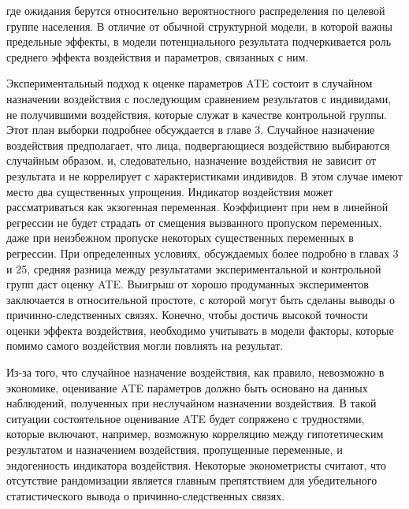 где ожидания берутся относительно вероятностного распределения по целевой группе населения. В отличие от обычной структурной модели, в которой важны  предельные эффекты, в модели потенциального результата подчеркивается роль среднего эффекта  воздействия и параметров, связанных с ним.


Экспериментальный подход к оценке параметров ATE состоит в случайном назначении воздействия с последующим сравнением результатов с индивидами, не получившими воздействия, которые служат в качестве контрольной группы. Этот план выборки подробнее обсуждается в главе 3. 
Случайное назначение воздействия  предполагает, что лица, подвергающиеся воздействию выбираются случайным образом, и, следовательно, назначение воздействия не зависит от результата и не коррелирует с характеристиками индивидов. 
В этом случае имеют место два существенных упрощения.
Индикатор воздействия может рассматриваться как экзогенная переменная. Коэффициент при нем в линейной регрессии не будет страдать от смещения вызванного пропуском переменных, даже при неизбежном пропуске  некоторых существенных переменных в регрессии. При определенных условиях, обсуждаемых более подробно в главах 3 и 25, средняя разница между результатами экспериментальной и контрольной групп даст оценку ATE. Выигрыш от хорошо продуманных экспериментов заключается в относительной простоте, с которой могут быть сделаны выводы о причинно-следственных связях. Конечно, чтобы достичь высокой точности оценки эффекта воздействия, необходимо учитывать в модели факторы, которые помимо самого воздействия могли повлиять на результат. 
	
	
Из-за того, что случайное назначение воздействия, как правило, невозможно в экономике, оценивание ATE параметров должно быть основано на данных наблюдений, полученных при неслучайном назначении воздействия. 
В такой ситуации состоятельное оценивание ATE будет сопряжено с трудностями, которые включают, например, возможную корреляцию между гипотетическим результатом и назначением воздействия, пропущенные переменные, и эндогенность индикатора воздействия. Некоторые эконометристы считают, что отсутствие рандомизации является главным препятствием для убедительного статистического вывода о причинно-следственных связях.
	
